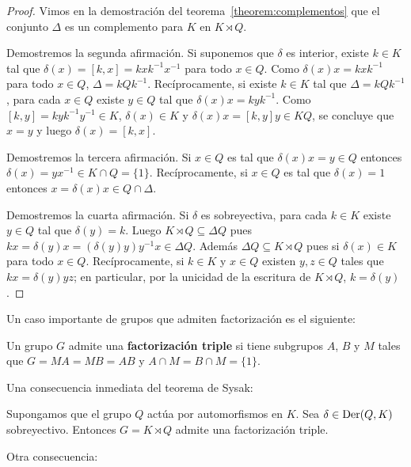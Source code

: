 \begin{proof}
	Vimos en la demostración del teorema~\ref{theorem:complementos} que
	el conjunto $\Delta$ es un complemento para $K$ en $K\rtimes Q$. 

	Demostremos la segunda afirmación. Si suponemos que $\delta$ es interior,
	existe $k\in K$ tal que $\delta(x)=[k,x]=kxk^{-1}x^{-1}$ para todo $x\in
	Q$. Como $\delta(x)x=kxk^{-1}$ para todo $x\in Q$,  $\Delta=kQk^{-1}$.
	Recíprocamente, si existe $k\in K$ tal que $\Delta=kQk^{-1}$, para cada
	$x\in Q$ existe $y\in Q$ tal que $\delta(x)x=kyk^{-1}$. Como
	$[k,y]=kyk^{-1}y^{-1}\in K$, $\delta(x)\in K$ y $\delta(x)x=[k,y]y\in KQ$,
	se concluye que $x=y$ y luego $\delta(x)=[k,x]$. 

	Demostremos la tercera afirmación. Si $x\in Q$ es tal que $\delta(x)x=y\in
	Q$ entonces $\delta(x)=yx^{-1}\in K\cap Q=\{1\}$. Recíprocamente, si $x\in Q$
	es tal que $\delta(x)=1$ entonces $x=\delta(x)x\in Q\cap\Delta$. 

	Demostremos la cuarta afirmación. Si $\delta$ es sobreyectiva, para cada
	$k\in K$ existe $y\in Q$ tal que $\delta(y)=k$. Luego $K\rtimes Q\subseteq
	\Delta Q$ pues $kx=\delta(y)x=(\delta(y)y)y^{-1}x\in \Delta Q$. Además
	$\Delta Q\subseteq K\rtimes Q$ pues si $\delta(x)\in K$ para todo $x\in Q$.
	Recíprocamente, si $k\in K$ y $x\in Q$ existen 
	$y,z\in Q$ tales que $kx=\delta(y)yz$; en particular, 
	por la unicidad de la escritura de $K\rtimes Q$,
	$k=\delta(y)$. 
\end{proof}

Un caso importante de grupos que admiten factorización
es el siguiente: 

\begin{definition}
	Un grupo $G$ admite una \textbf{factorización triple} si tiene subgrupos
	$A$, $B$ y $M$ tales que $G=MA=MB=AB$ y $A\cap M=B\cap M=\{1\}$.
\end{definition}


Una consecuencia inmediata del teorema de Sysak:

\begin{corollary}
	Supongamos que el grupo $Q$ actúa por automorfismos en $K$. Sea
	$\delta\in\operatorname{Der}(Q,K)$ sobreyectivo. Entonces $G=K\rtimes Q$ admite una
	factorización triple.
\end{corollary}

Otra consecuencia: 


